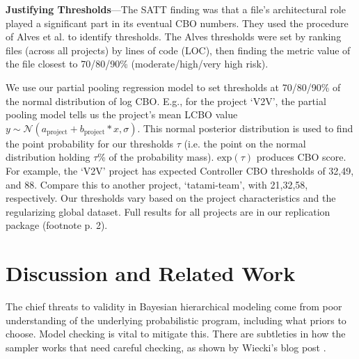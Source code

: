 \documentclass[sigconf,natbib=false]{acmart}
\begin{document}
\noindent\textbf{Justifying Thresholds}---The SATT finding \cite{Aniche2016} was
that a file's architectural role played a significant part in its eventual CBO
numbers. They used the procedure of Alves et al. \cite{alves2010deriving} to
identify thresholds. The Alves thresholds were set by ranking files (across all
projects) by lines of code (LOC), then finding the metric value of the file
closest to 70/80/90\% (moderate/high/very high risk). 

We use our partial pooling regression model to set thresholds at 70/80/90\% of
the normal distribution of log CBO. E.g., for the project `V2V', the partial
pooling model tells us the project's mean LCBO value $y \sim
\mathcal{N}(a_\text{project} + b_\text{project}*x, \sigma)$. This normal
posterior distribution is used to find the point probability for our thresholds
$\tau$ (i.e. the point on the normal distribution holding $\tau$\% of the
probability mass). $\text{exp}(\tau)$ produces CBO score. For example, the `V2V'
project has expected Controller CBO thresholds of 32,49, and 88. Compare this to
another project, `tatami-team', with 21,32,58, respectively. Our thresholds vary
based on the project characteristics and the regularizing global dataset. Full
results for all projects are in our replication package (footnote p. 2).

\section{Discussion and Related Work}
\label{related}
The chief threats to validity in Bayesian hierarchical modeling come from poor
understanding of the underlying probabilistic program, including what priors to
choose. Model checking is vital to mitigate this. There are subtleties in how
the sampler works that need careful checking, as shown by Wiecki's blog post
\cite{Wiecki17}. 
\end{document}
